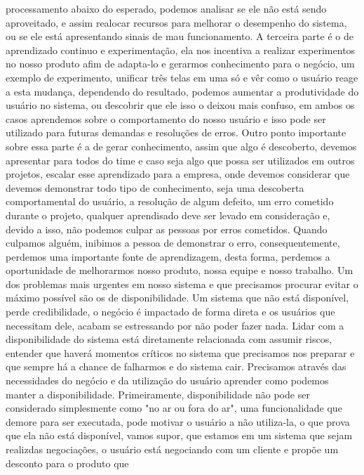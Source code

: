   processamento abaixo do esperado, podemos analisar se ele não está sendo
  aproveitado, e assim realocar recursos para melhorar o desempenho do sistema,
  ou se ele está apresentando sinais de mau funcionamento. A terceira parte é o
  de aprendizado continuo e experimentação, ela nos incentiva a realizar
  experimentos no nosso produto afim de adapta-lo e gerarmos conhecimento para o
  negócio, um exemplo de experimento, unificar três telas em uma só e vêr como o
  usuário reage a esta mudança, dependendo do resultado, podemos aumentar a
  produtividade do usuário no sistema, ou descobrir que ele isso o deixou mais
  confuso, em ambos os casos aprendemos sobre o comportamento do nosso usuário e
  isso pode ser utilizado para futuras demandas e resoluções de erros. Outro ponto
  importante sobre essa parte é a de gerar conhecimento, assim que algo é
  descoberto, devemos apresentar para todos do time e caso seja algo que possa
  ser utilizados em outros projetos, escalar esse aprendizado para a empresa,
  onde devemos considerar que devemos demonstrar todo tipo de conhecimento, seja
  uma descoberta comportamental do usuário, a resolução de algum defeito, um erro
  cometido durante o projeto, qualquer aprendisado deve ser levado em consideração
  e, devido a isso, não podemos culpar as pessoas por erros cometidos. Quando
  culpamos alguém, inibimos a pessoa de demonstrar o erro, consequentemente,
  perdemos uma importante fonte de aprendizagem, desta forma, perdemos a oportunidade
  de melhorarmos nosso produto, nossa equipe e nosso trabalho. \newline
  Um dos problemas mais urgentes em nosso sistema e que precisamos procurar evitar
  o máximo possível são os de disponibilidade. Um sistema que não está disponível,
  perde credibilidade, o negócio é impactado de forma direta e os usuários que
  necessitam dele, acabam se estressando por não poder fazer nada. Lidar com a
  disponibilidade do sistema está diretamente relacionada com assumir riscos,
  entender que haverá momentos críticos no sistema que precisamos nos preparar e
  que sempre há a chance de falharmos e do sistema cair. Precisamos através das
  necessidades do negócio e da utilização do usuário aprender como podemos manter
  a disponibilidade. Primeiramente, disponibilidade não pode ser considerado
  simplesmente como "no ar ou fora do ar", uma funcionalidade que demore para ser
  executada, pode motivar o usuário a não utiliza-la, o que prova que ela não está
  disponível, vamos supor, que estamos em um sistema que sejam realizdas negociações,
  o usuário está negociando com um cliente e propõe um desconto para o produto que
